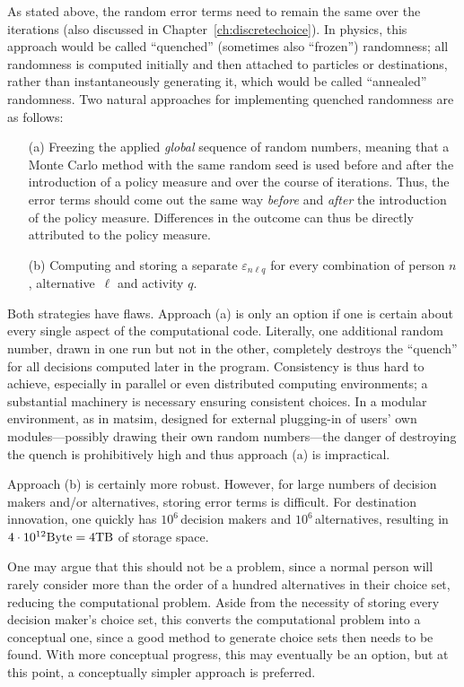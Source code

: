 As stated above, the random error terms need to remain the same over the iterations (also discussed in Chapter~\ref{ch:discretechoice}). 
In physics, this approach would be called ``quenched'' (sometimes also ``frozen'') randomness; all randomness is computed initially and then attached to particles or destinations, rather than instantaneously generating it, which would be called ``annealed'' randomness. 
Two natural approaches for implementing quenched randomness are as follows:
%
\begin{itemize}\styleItemize
\item[(a)] Freezing the applied \emph{global} sequence of random numbers, meaning that a Monte Carlo method with the same random seed is used before and after the introduction of a policy measure and over the course of iterations. Thus, the error terms should come out the same way \emph{before} and \emph{after} the introduction of the policy measure. Differences in the outcome can thus be directly attributed to the policy measure. 
\item[(b)] Computing and storing a separate $\varepsilon_{n\ell q}$ for every combination of person $n$, alternative~$\ell$ and activity $q$.
\end{itemize}
 
Both strategies have flaws. 
Approach (a) is only an option if one is certain about every single aspect of the computational code. 
Literally, one additional random number, drawn in one run but not in the other, completely destroys the ``quench'' for all decisions computed later in the program. Consistency is thus hard to achieve, especially in parallel or even distributed computing environments; a substantial machinery is necessary ensuring consistent choices. 
In a modular environment, as in \gls{matsim}, designed for external plugging-in of users' own modules---possibly drawing their own random numbers---the danger of destroying the quench is prohibitively high and thus approach (a) is impractical.

Approach (b) is certainly more robust. 
However, for large numbers of decision makers and/or alternatives, storing error terms is difficult. 
For destination innovation, one quickly has $10^6$\,decision makers and $10^6$\,alternatives, resulting in $4 \cdot 10^{12} \hbox{Byte} = 4 \hbox{TB}$ of storage space.

One may argue that this should not be a problem, since a normal person will rarely consider more than the order of a hundred alternatives in their choice set, reducing the computational problem. Aside from the necessity of storing every decision maker's choice set, this converts the computational problem into a conceptual one, since a good method to generate choice sets then needs to be found. 
With more conceptual progress, this may eventually be an option, but at this point, a conceptually simpler approach is preferred.

